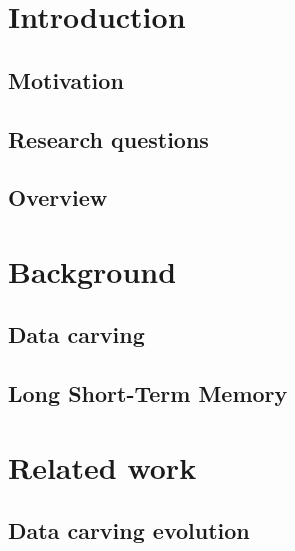 
\listoftodos

\section{\label{chap:introduction}Introduction}

\subsection{Motivation}


\subsection{Research questions}

\subsection{Overview}


\section{\label{chap:background}Background}

\subsection{\label{sec:datacarving}Data carving}



\subsection{\label{sec:lstm}Long Short-Term Memory}


\section{Related work}

    \subsection{Data carving evolution}
    
